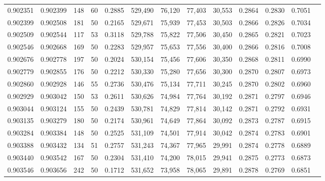 \begin{tabular}{rrrrrrrrrrrrr}
0.902351 & 0.902399 &   148 &  60 &                                     0.2885 & 529,490 &  76,120 &  77,403 &  30,553 & 0.2864 & 0.2830 & 0.7051 \\
0.902399 & 0.902508 &   181 &  50 &                                     0.2165 & 529,671 &  75,939 &  77,453 &  30,503 & 0.2866 & 0.2826 & 0.7034 \\
0.902509 & 0.902544 &   117 &  53 &                                     0.3118 & 529,788 &  75,822 &  77,506 &  30,450 & 0.2865 & 0.2821 & 0.7023 \\
0.902546 & 0.902668 &   169 &  50 &                                     0.2283 & 529,957 &  75,653 &  77,556 &  30,400 & 0.2866 & 0.2816 & 0.7008 \\
0.902676 & 0.902778 &   197 &  50 &                                     0.2024 & 530,154 &  75,456 &  77,606 &  30,350 & 0.2868 & 0.2811 & 0.6990 \\
0.902779 & 0.902855 &   176 &  50 &                                     0.2212 & 530,330 &  75,280 &  77,656 &  30,300 & 0.2870 & 0.2807 & 0.6973 \\
0.902860 & 0.902928 &   146 &  55 &                                     0.2736 & 530,476 &  75,134 &  77,711 &  30,245 & 0.2870 & 0.2802 & 0.6960 \\
0.902929 & 0.903042 &   150 &  53 &                                     0.2611 & 530,626 &  74,984 &  77,764 &  30,192 & 0.2871 & 0.2797 & 0.6946 \\
0.903044 & 0.903124 &   155 &  50 &                                     0.2439 & 530,781 &  74,829 &  77,814 &  30,142 & 0.2871 & 0.2792 & 0.6931 \\
0.903135 & 0.903279 &   180 &  50 &                                     0.2174 & 530,961 &  74,649 &  77,864 &  30,092 & 0.2873 & 0.2787 & 0.6915 \\
0.903284 & 0.903384 &   148 &  50 &                                     0.2525 & 531,109 &  74,501 &  77,914 &  30,042 & 0.2874 & 0.2783 & 0.6901 \\
0.903388 & 0.903432 &   134 &  51 &                                     0.2757 & 531,243 &  74,367 &  77,965 &  29,991 & 0.2874 & 0.2778 & 0.6889 \\
0.903440 & 0.903542 &   167 &  50 &                                     0.2304 & 531,410 &  74,200 &  78,015 &  29,941 & 0.2875 & 0.2773 & 0.6873 \\
0.903546 & 0.903656 &   242 &  50 &                                     0.1712 & 531,652 &  73,958 &  78,065 &  29,891 & 0.2878 & 0.2769 & 0.6851 \\

\end{tabular}
